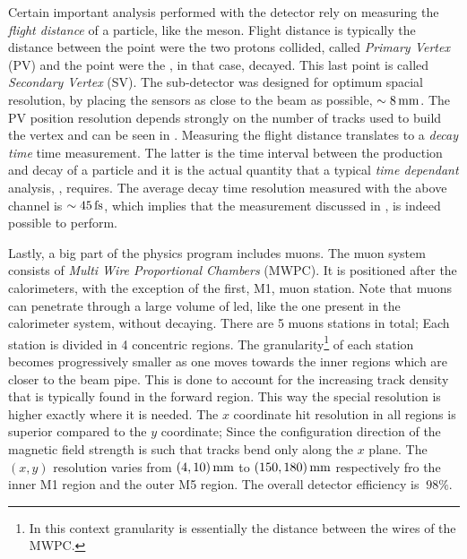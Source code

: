 Certain important analysis performed with the \lhcb detector rely on measuring the {\it flight distance} of a particle, like the \Bs meson.
Flight distance is typically the distance between the point were the two protons collided, called {\it Primary Vertex} (PV)
and the point were the \Bs, in that case, decayed. This last point is called {\it Secondary Vertex} (SV). The \velo sub-detector
was designed for optimum spacial resolution, by placing the \velo sensors as close to the beam as possible, $\sim 8 \rm \,mm$.
The PV position resolution depends strongly on the number of tracks used to build the vertex and can be seen in .
Measuring the flight distance translates to a {\it decay time} time measurement. The latter is the time interval between
the production and decay of a particle and it is the actual quantity that a typical {\it time dependant} analysis,
\eg \BsJpsiPhi, requires. The average decay time resolution measured with the above channel is $\sim 45\rm \,fs$, which
implies that the \phis measurement discussed in , is indeed possible to perform.

Lastly, a big part of the \lhcb physics program includes muons. The muon system consists of {\it Multi Wire Proportional Chambers}
(MWPC). It is positioned after the calorimeters, with the exception of the first, M1, muon station.
Note that muons can penetrate through a large volume of led, like the one present in the calorimeter system,
without decaying. There are 5 muons stations in total; Each station is divided in 4 concentric regions.
The granularity\footnote{In this context granularity is essentially the distance between the wires of the MWPC.}
of each station becomes progressively smaller as one moves towards the inner regions which are closer to the beam pipe.
This is done to account for the increasing track density that is typically found in the forward region. This way
the special resolution is higher exactly where it is needed. The $x$ coordinate hit resolution in all regions
is superior compared to the $y$ coordinate; Since the configuration direction of the \lhcb magnetic field strength
is such that tracks bend only along the $x$ plane. The $(x,y)$ resolution varies from $(4,10)\rm \,mm$ to $(150,180)\rm \,mm$
respectively fro the inner M1 region and the outer M5 region. The overall detector efficiency is $\>98\%$.
